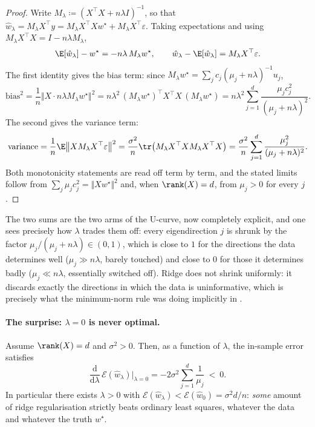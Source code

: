 \begin{proof}
Write $M_\lambda \coloneqq (X^\top X + n \lambda I)^{-1}$, so that $\hat w_\lambda =
M_\lambda X^\top y = M_\lambda X^\top X w^\star + M_\lambda X^\top \varepsilon$. Taking
expectations and using $M_\lambda X^\top X = I - n\lambda M_\lambda$,
\[
\E[\hat w_\lambda] - w^\star = - n \lambda\, M_\lambda w^\star ,
\qquad
\hat w_\lambda - \E[\hat w_\lambda] = M_\lambda X^\top \varepsilon .
\]
The first identity gives the bias term: since $M_\lambda w^\star = \sum_j c_j (\mu_j +
n\lambda)^{-1} u_j$,
\[
\mathrm{bias}^2 = \frac1n \big\Vert X \cdot n\lambda M_\lambda w^\star \big\Vert^2
= n \lambda^2 \, (M_\lambda w^\star)^\top X^\top X\, (M_\lambda w^\star)
= n\lambda^2 \sum_{j=1}^d \frac{\mu_j c_j^2}{(\mu_j + n\lambda)^2} .
\]
The second gives the variance term:
\[
\mathrm{variance} = \frac1n \E \big\Vert X M_\lambda X^\top \varepsilon \big\Vert^2
= \frac{\sigma^2}{n} \tr\big( M_\lambda X^\top X M_\lambda X^\top X \big)
= \frac{\sigma^2}{n} \sum_{j=1}^d \frac{\mu_j^2}{(\mu_j + n\lambda)^2} .
\]
Both monotonicity statements are read off term by term, and the stated limits follow
from $\sum_j \mu_j c_j^2 = \Vert X w^\star \Vert^2$ and, when $\rank(X) = d$, from
$\mu_j > 0$ for every $j$.
\end{proof}

The two sums are the two arms of the U-curve, now completely explicit, and one sees
precisely how $\lambda$ trades them off: every eigendirection $j$ is shrunk by the
factor $\mu_j / (\mu_j + n\lambda) \in (0,1)$, which is close to $1$ for the directions
the data determines well ($\mu_j \gg n\lambda$, barely touched) and close to $0$ for
those it determines badly ($\mu_j \ll n\lambda$, essentially switched off). Ridge does
not shrink uniformly: it discards exactly the directions in which the data is
uninformative, which is precisely what the minimum-norm rule was doing implicitly in
.

\paragraph{The surprise: $\lambda = 0$ is never optimal.}

\begin{corollary}
\label{cor:ridge-beats-ols}
Assume $\rank(X) = d$ and $\sigma^2 > 0$. Then, as a function of $\lambda$, the
in-sample error satisfies
\[
\frac{\mathrm{d}}{\mathrm{d}\lambda} \, \mathcal{E}(\hat w_\lambda) \Big|_{\lambda = 0}
= - 2 \sigma^2 \sum_{j=1}^d \frac{1}{\mu_j} \ < \ 0 .
\]
In particular there exists $\lambda > 0$ with $\mathcal{E}(\hat w_\lambda) <
\mathcal{E}(\hat w_0) = \sigma^2 d / n$: \emph{some} amount of ridge regularisation
strictly beats ordinary least squares, whatever the data and whatever the truth
$w^\star$.
\end{corollary}

